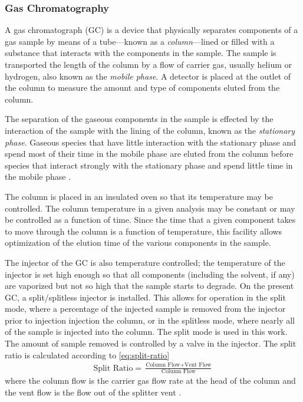 \documentclass[../main.tex]{subfiles}
\begin{document}
\subsubsection{Gas Chromatography}

A gas chromatograph (GC) is a device that physically separates components
of a gas sample by means of a tube---known as a \textit{column}---lined or filled
with a substance that interacts with the components in the sample. The sample
is transported the length of the column by a flow of carrier gas, usually
helium or hydrogen, also known as the \textit{mobile phase}. A detector is
placed at the outlet of the column to measure the amount and type
of components eluted from the column.

The separation of the gaseous components in the sample is effected by
the interaction of the sample with the lining of the column, known as the
\textit{stationary phase}. Gaseous species that have little interaction with
the stationary phase and spend most of their time in the mobile phase
are eluted from the column before species that interact strongly with
the stationary phase and spend little time in the mobile phase \cite{Sparkman2011a}.

The column is placed in an insulated oven so that its temperature may be
controlled. The column temperature in a given analysis may be constant
or may be controlled as a function of time. Since the time that a given
component takes to move through the column is a function of temperature,
this facility allows optimization of the elution time of the various
components in the sample.

The injector of the GC is also temperature controlled; the temperature of
the injector is set high enough so that all components (including the solvent,
if any) are vaporized but not so high that the sample starts to degrade. On the present GC,
a split/splitless injector is installed. This allows for operation in the
split mode, where a percentage of the injected sample is removed from the
injector prior to injection injection the column, or in the splitless mode,
where nearly all of the sample is injected into the column. The split mode
is used in this work. The amount of sample removed is controlled by a valve
in the injector. The split ratio is calculated according to \autoref{eq:split-ratio}
%
\begin{gather}
\label{eq:split-ratio}
\text{Split Ratio} = \frac{\text{Column Flow} +\text{Vent Flow}}{\text{Column Flow}}
\end{gather}
%
where the column flow is the carrier gas flow rate at the head of the column
and the vent flow is the flow out of the splitter vent \cite{Sparkman2011a}.
\end{document}

